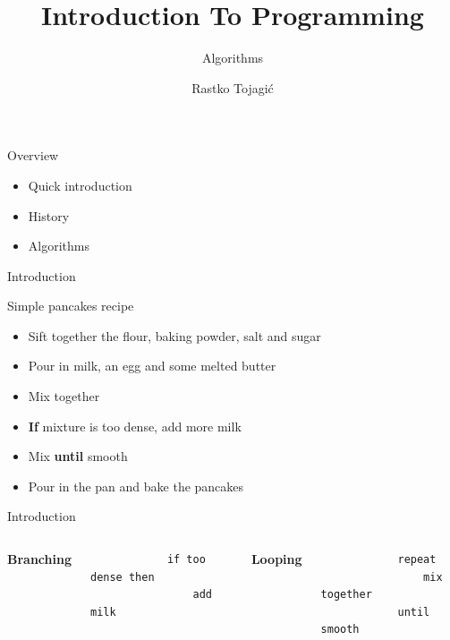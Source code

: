 \documentclass{beamer}
\title{Introduction To Programming}
\subtitle{Algorithms}
\author{Rastko Tojagi\'c}
\institute{%
    CS Class
}
\date{}
\newcommand{\bfemph}[1]{\textbf{#1}}
\renewcommand{\emph}[1]{\bfemph{#1}}
\begin{document}
\begin{frame}
   \titlepage
\end{frame}

\begin{frame}{Overview}

    \begin{itemize}
        \item Quick introduction
        \item History
        \item Algorithms
    \end{itemize}

\end{frame}

\begin{frame}{Introduction}

    Simple pancakes recipe

    \bigskip

    \begin{itemize}
        \item Sift together the flour, baking powder, salt and sugar
        \pause
        \item Pour in milk, an egg and some melted butter
        \pause
        \item Mix together
        \pause
        \item \emph{If} mixture is too dense, add more milk 
        \pause
        \item Mix \emph{until} smooth
        \pause
        \item Pour in the pan and bake the pancakes
    \end{itemize}

\end{frame}

\begin{frame}[fragile]{Introduction}
\begin{columns}
    \emph{Branching}
        \begin{verbatim}
            if too dense then
                add milk
        \end{verbatim}

    
        \emph{Looping}
        \begin{verbatim}
            repeat
                mix together
            until smooth
        \end{verbatim}
\end{columns}        

\end{frame}
\end{document}
